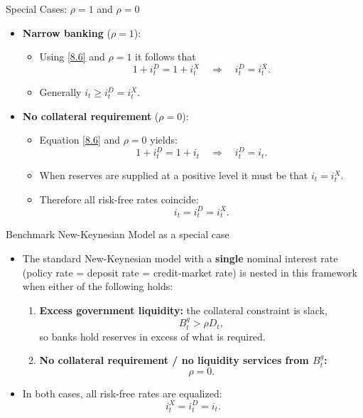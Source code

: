 \documentclass[11pt,aspectratio=169]{beamer}
\begin{document}
\begin{frame}{Special Cases: $\rho = 1$ and $\rho = 0$}
  \begin{itemize}
    \item \textbf{Narrow banking} ($\rho = 1$):
    \begin{itemize}
        \item Using \eqref{8.6} and $\rho=1$ it follows that 
        $$1+i_t^D = 1+i_t^X
      \quad\Rightarrow\quad
      i_t^D = i_t^X.$$
        \item Generally $i_t \ge i_t^D = i_t^X$.
    \end{itemize}
\medskip
    \item \textbf{No collateral requirement} ($\rho = 0$):
    \begin{itemize}
        \item Equation \eqref{8.6} and $\rho=0$ yields: 
    $$1+i_t^D = 1+i_t
      \quad\Rightarrow\quad
      i_t^D = i_t.$$
    \item When reserves are supplied at a positive level it must be that $i_t = i_t^X$. 
    \item Therefore all risk-free rates coincide:
    $$i_t = i_t^D = i_t^X.$$
    \end{itemize}
  \end{itemize}
\end{frame}

\begin{frame}{Benchmark New-Keynesian Model as a special case}

    \begin{itemize}
        \item The standard New-Keynesian model with a \textbf{single} nominal interest rate
        (policy rate = deposit rate = credit-market rate) is nested in this framework when
        either of the following holds:
        \begin{enumerate}
            \item \textbf{Excess government liquidity:} the collateral constraint is slack,
            \[
                B_t^g > \rho D_t,
            \]
            so banks hold reserves in excess of what is required.
            \item \textbf{No collateral requirement / no liquidity services from $B_t^g$:}
            \[
                \rho = 0.
            \]
        \end{enumerate}
        \item In both cases, all risk-free rates are equalized:
        \[
            i_t^X = i_t^D = i_t.
        \]
    \end{itemize}
\end{frame}
\end{document}
